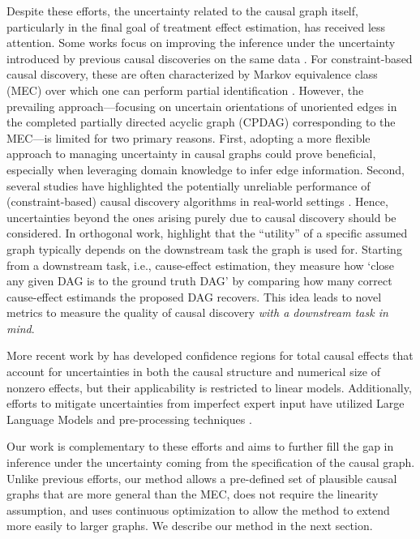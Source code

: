 Despite these efforts, the uncertainty related to the causal graph itself, particularly in the final goal of treatment effect estimation, has received less attention.
Some works focus on improving the inference under the uncertainty introduced by previous causal discoveries on the same data \citep{chang2024post, gradu2022valid, malinsky2024cautious}.
For constraint-based causal discovery, these are often characterized by Markov equivalence class (MEC) over which one can perform partial identification \citep{maathuis2009estimating, bellot2024towards}.
However, the prevailing approach---focusing on uncertain orientations of unoriented edges in the completed partially directed acyclic graph (CPDAG) corresponding to the MEC---is limited for two primary reasons.
First, adopting a more flexible approach to managing uncertainty in causal graphs could prove beneficial, especially when leveraging domain knowledge to infer edge information.
Second, several studies have highlighted the potentially unreliable performance of (constraint-based) causal discovery algorithms in real-world settings \citep{reisach2021beware}. Hence, uncertainties beyond the ones arising purely due to causal discovery should be considered.
In orthogonal work, \citet{henckel2024adjustment} highlight that the ``utility'' of a specific assumed graph typically depends on the downstream task the graph is used for. Starting from a downstream task, i.e., cause-effect estimation, they measure how `close any given DAG is to the ground truth DAG' by comparing how many correct cause-effect estimands the proposed DAG recovers. This idea leads to novel metrics to measure the quality of causal discovery \emph{with a downstream task in mind}.

More recent work by \citet{strieder2023confidence,strieder2024dual} has developed confidence regions for total causal effects that account for uncertainties in both the causal structure and numerical size of nonzero effects, but their applicability is restricted to linear models.
Additionally, efforts to mitigate uncertainties from imperfect expert input have utilized Large Language Models \citep{long2023causal} and pre-processing techniques \citep{oates2017repair}.

Our work is complementary to these efforts and aims to further fill the gap in inference under the uncertainty coming from the specification of the causal graph. Unlike previous efforts, our method allows a pre-defined set of plausible causal graphs that are more general than the MEC, does not require the linearity assumption, and uses continuous optimization to allow the method to extend more easily to larger graphs. We describe our method in the next section.

%
%
%